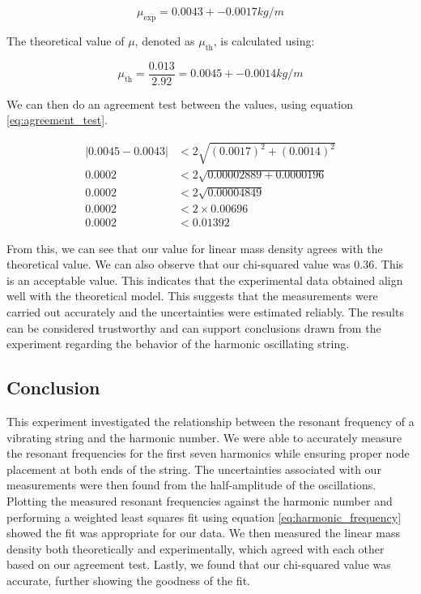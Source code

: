 \documentclass[11pt]{article}
\begin{document}
    \begin{equation}
    \mu_{\text{exp}} = 0.0043 +- 0.0017 kg/m
    \end{equation}
    
    The theoretical value of $\mu$, denoted as $\mu_{\text{th}}$, is calculated using:
    
    \begin{equation}
    \mu_{\text{th}} = \frac{0.013}{2.92} = 0.0045 +- 0.0014 kg/m
    \end{equation}

    We can then do an agreement test between the values, using equation \ref{eq:agreement_test}.

    \begin{align*}
    |0.0045 - 0.0043| &< 2 \sqrt{(0.0017)^2 + (0.0014)^2} \\
    0.0002 &< 2 \sqrt{0.00002889 + 0.0000196} \\
    0.0002 &< 2 \sqrt{0.00004849} \\
    0.0002 &< 2 \times 0.00696 \\
    0.0002 &< 0.01392
    \end{align*}

    From this, we can see that our value for linear mass density agrees with the theoretical value.
    We can also observe that our chi-squared value was 0.36.
    This is an acceptable value.
    This indicates that the experimental data obtained align well with the theoretical model.
    This suggests that the measurements were carried out accurately and the uncertainties were estimated reliably.
    The results can be considered trustworthy and can support conclusions drawn from the experiment regarding the behavior of the harmonic oscillating string.


    
    \subsection{Conclusion}\label{subsec:part_1_conclusion}
    This experiment investigated the relationship between the resonant frequency of a vibrating string and the harmonic number.
    We were able to accurately measure the resonant frequencies for the first seven harmonics while ensuring proper node placement at both ends of the string.
    The uncertainties associated with our measurements were then found from the half-amplitude of the oscillations.
    Plotting the measured resonant frequencies against the harmonic number and performing a weighted least squares fit using equation \ref{eq:harmonic_frequency} showed the fit was appropriate for our data.
    We then measured the linear mass density both theoretically and experimentally, which agreed with each other based on our agreement test.
    Lastly, we found that our chi-squared value was accurate, further showing the goodness of the fit.
\end{document}
